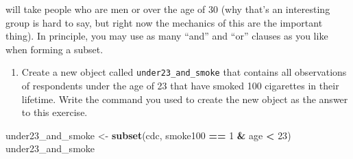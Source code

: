 \documentclass[]{article}
\newenvironment{Shaded}{\begin{snugshade}}{\end{snugshade}}
\newcommand{\KeywordTok}[1]{\textcolor[rgb]{0.13,0.29,0.53}{\textbf{#1}}}
\newcommand{\DecValTok}[1]{\textcolor[rgb]{0.00,0.00,0.81}{#1}}
\newcommand{\StringTok}[1]{\textcolor[rgb]{0.31,0.60,0.02}{#1}}
\newcommand{\OperatorTok}[1]{\textcolor[rgb]{0.81,0.36,0.00}{\textbf{#1}}}
\newcommand{\NormalTok}[1]{#1}
\providecommand{\tightlist}{%
  \setlength{\itemsep}{0pt}\setlength{\parskip}{0pt}}
\begin{document}
will take people who are men or over the age of 30 (why that's an
interesting group is hard to say, but right now the mechanics of this
are the important thing). In principle, you may use as many ``and'' and
``or'' clauses as you like when forming a subset.

\begin{enumerate}
\def\labelenumi{\arabic{enumi}.}
\setcounter{enumi}{2}
\tightlist
\item
  Create a new object called \texttt{under23\_and\_smoke} that contains
  all observations of respondents under the age of 23 that have smoked
  100 cigarettes in their lifetime. Write the command you used to create
  the new object as the answer to this exercise.
\end{enumerate}

\begin{Shaded}
\begin{Highlighting}[]
\NormalTok{under23_and_smoke <-}\StringTok{ }\KeywordTok{subset}\NormalTok{(cdc, smoke100 }\OperatorTok{==}\StringTok{ }\DecValTok{1} \OperatorTok{&}\StringTok{ }\NormalTok{age }\OperatorTok{<}\StringTok{ }\DecValTok{23}\NormalTok{)}
\NormalTok{under23_and_smoke}
\end{Highlighting}
\end{Shaded}
\end{document}
